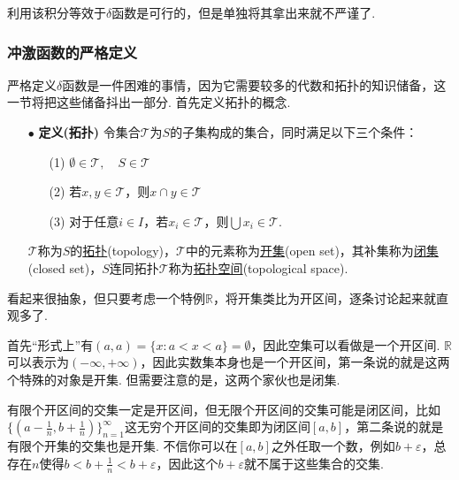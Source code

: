\documentclass[UTF8]{ctexart}
\newcommand{\trm}[1]{{\rm #1}}
\begin{document}
利用该积分等效于\(\delta\)函数是可行的，但是单独将其拿出来就不严谨了. 

\subsubsection{冲激函数的严格定义}

严格定义\(\delta\)函数是一件困难的事情，因为它需要较多的代数和拓扑的知识储备，这一节将把这些储备抖出一部分. 首先定义拓扑的概念.

\begin{itemize}
    \item[\(\bullet\)] \textbf{定义(拓扑)}
    \newline
    令集合\(\mathcal{T}\)为\(S\)的子集构成的集合，同时满足以下三个条件：
    \begin{itemize}
        \item [(1)] \(\emptyset \in \mathcal{T}, \quad S \in \mathcal{T}\)
        \item [(2)] 若\(x,y \in \mathcal{T}\)，则\(x \cap y \in \mathcal{T}\)
        \item [(3)] 对于任意\(i \in I\)，若\(x_i \in \mathcal{T}\)，则\(\bigcup x_i \in \mathcal{T}\).
    \end{itemize}
    \(\mathcal{T}\)称为\(S\)的\uline{拓扑}(topology)，\(\mathcal{T}\)中的元素称为\uline{开集}(open set)，其补集称为\uline{闭集}(closed set)，\(S\)连同拓扑\(\mathcal{T}\)称为\uline{拓扑空间}(topological space).
\end{itemize}

看起来很抽象，但只要考虑一个特例\(\mathbb{R}\)，将开集类比为开区间，逐条讨论起来就直观多了. 

首先“形式上”有\((a,a)=\{x: a<x<a\}=\emptyset\)，因此空集可以看做是一个开区间. \(\mathbb{R}\)可以表示为\((-\infty,+\infty)\)，因此实数集本身也是一个开区间，第一条说的就是这两个特殊的对象是开集. 但需要注意的是，这两个家伙也是闭集.

有限个开区间的交集一定是开区间，但无限个开区间的交集可能是闭区间，比如\(\{(a-\frac{1}{n}, b+\frac{1}{n})\}_{n=1}^{\infty}\)这无穷个开区间的交集即为闭区间\([a,b]\)，第二条说的就是有限个开集的交集也是开集. 不信你可以在\([a,b]\)之外任取一个数，例如\(b+\varepsilon\)，总存在\(n\)使得\(b<b+\frac{1}{n}<b+\varepsilon\)，因此这个\(b+\varepsilon\)就不属于这些集合的交集.
\end{document}
